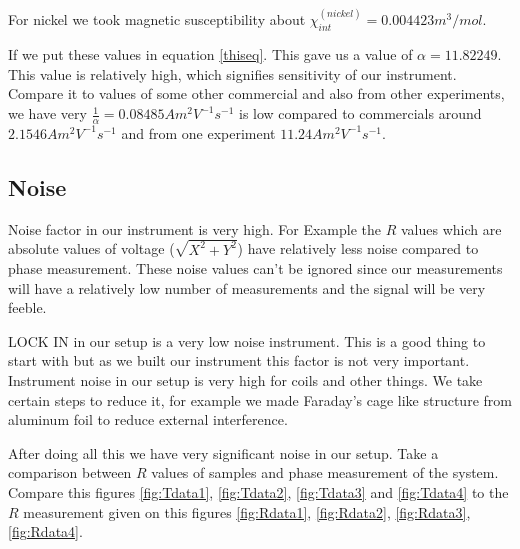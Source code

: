 For nickel we took magnetic susceptibility about $\chi_{int}^{(nickel)}=0.004423 m^3/mol$.

If we put these values in equation \ref{thiseq}. This gave us a value of $\alpha = 11.82249$. This value is relatively high, which signifies sensitivity of our instrument. Compare it to values of some other commercial and also from other experiments, we have very $\frac{1}{\alpha}=0.08485 Am^2V^{-1}s^{-1}$ is low compared to commercials around $2.1546Am^2V^{-1}s^{-1}$ and from one experiment $11.24 Am^2V^{-1}s^{-1}$\cite{cambr}.


\subsection{Noise}


Noise factor in our instrument is very high. For Example the $R$ values which are absolute values of voltage ($\sqrt{X^2+Y^2}$) have relatively less noise compared to phase measurement. These noise values can’t be ignored since our measurements will have a relatively low number of measurements and the signal will be very feeble.



LOCK IN in our setup is a very low noise instrument. This is a good thing to start with but as we built our instrument this factor is not very important. Instrument noise in our setup is very high for coils and other things. We take certain steps to reduce it, for example we made Faraday's cage like structure from aluminum foil to reduce external interference. 




After doing all this we have very significant noise in our setup. Take a comparison between $R$ values of samples and phase measurement of the system. Compare this figures \ref{fig:Tdata1}, \ref{fig:Tdata2}, \ref{fig:Tdata3} and  \ref{fig:Tdata4} to the $R$ measurement given on this figures \ref{fig:Rdata1}, \ref{fig:Rdata2}, \ref{fig:Rdata3}, \ref{fig:Rdata4}.


